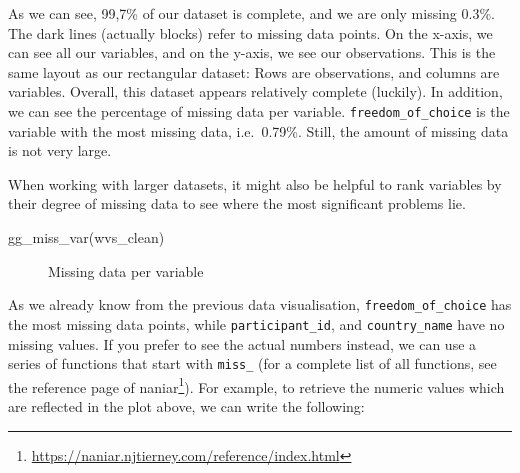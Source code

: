 \documentclass[
  letterpaper,
]{krantz}
\makeatletter
\newenvironment{Shaded}{\begin{snugshade}}{\end{snugshade}}
\newcommand{\FunctionTok}[1]{\textcolor[rgb]{0.28,0.35,0.67}{#1}}
\newcommand{\NormalTok}[1]{\textcolor[rgb]{0.00,0.23,0.31}{#1}}
\renewcommand{\href}[2]{#2\footnote{\url{#1}}}
\newenvironment{kframe}{%
\medskip{}
\setlength{\fboxsep}{.8em}
 \def\at@end@of@kframe{}%
 \ifinner\ifhmode%
  \def\at@end@of@kframe{\end{minipage}}%
  \begin{minipage}{\columnwidth}%
 \fi\fi%
 \def\FrameCommand##1{\hskip\@totalleftmargin \hskip-\fboxsep
 \colorbox{shadecolor}{##1}\hskip-\fboxsep
     \hskip-\linewidth \hskip-\@totalleftmargin \hskip\columnwidth}%
 \MakeFramed {\advance\hsize-\width
   \@totalleftmargin\z@ \linewidth\hsize
   \@setminipage}}%
 {\par\unskip\endMakeFramed%
 \at@end@of@kframe}
\renewenvironment{Shaded}{\begin{kframe}}{\end{kframe}}
\makeatother
\begin{document}
As we can see, 99,7\% of our dataset is complete, and we are only
missing 0.3\%. The dark lines (actually blocks) refer to missing data
points. On the x-axis, we can see all our variables, and on the y-axis,
we see our observations. This is the same layout as our rectangular
dataset: Rows are observations, and columns are variables. Overall, this
dataset appears relatively complete (luckily). In addition, we can see
the percentage of missing data per variable.
\texttt{freedom\_of\_choice} is the variable with the most missing data,
i.e.~0.79\%. Still, the amount of missing data is not very large.

When working with larger datasets, it might also be helpful to rank
variables by their degree of missing data to see where the most
significant problems lie.

\begin{Shaded}
\begin{Highlighting}[]
\FunctionTok{gg\_miss\_var}\NormalTok{(wvs\_clean)}
\end{Highlighting}
\end{Shaded}

\begin{figure}[H]


\caption{\label{fig-missing-data-per-variable}Missing data per variable}

\end{figure}%

As we already know from the previous data visualisation,
\texttt{freedom\_of\_choice} has the most missing data points, while
\texttt{participant\_id}, and \texttt{country\_name} have no missing
values. If you prefer to see the actual numbers instead, we can use a
series of functions that start with \texttt{miss\_} (for a complete list
of all functions, see the
\href{https://naniar.njtierney.com/reference/index.html}{reference page
of naniar}). For example, to retrieve the numeric values which are
reflected in the plot above, we can write the following:
\end{document}
